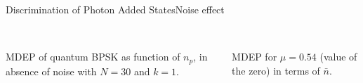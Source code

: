 \begin{frame}{Discrimination of Photon Added States}{Noise effect}
    \begin{columns}
        \begin{column}{0.5\linewidth}
            \begin{center}
                \resizebox{\textwidth}{!}{
                    
                }\\
                \scriptsize{
                    MDEP of quantum BPSK as function of $n_p$, in absence of noise with $N=30$ and $k=1$. 
                }
            \end{center}
        \end{column}
        \begin{column}{0.5\linewidth}
            \begin{center}
                \resizebox{\textwidth}{!}{
                    
                }\\
                \scriptsize{
                    MDEP for $\mu=0.54$ (value of the zero) in terms of $\bar{n}$. 
                }
            \end{center}
        \end{column}
    \end{columns}
\end{frame}